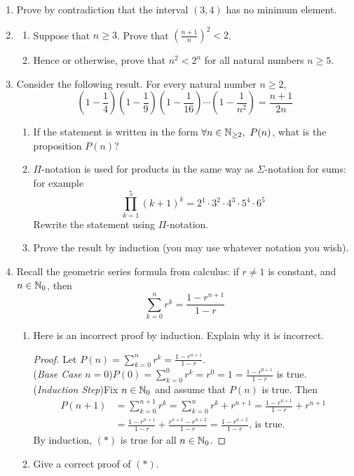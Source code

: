 \begin{exercises}{}{}

\begin{enumerate}
  \item Prove by contradiction that the interval $(3,4)$ has no minimum element.
  
  \item\begin{enumerate}
    \item Suppose that $n\ge 3$. Prove that $\left(\frac{n+1}n\right)^2<2$.
    \item Hence or otherwise, prove that $n^2<2^n$ for all natural numbers $n\ge 5$.
  \end{enumerate}

  \item Consider the following result. For every natural number $n\ge 2$,
	\[\left(1-\frac{1}{4}\right) \left(1-\frac{1}{9}\right) \left(1-\frac{1}{16}\right) \cdots \left(1-\frac{1}{n^2}\right) = \frac{n+1}{2n}\]
  \begin{enumerate}
    \item If the statement is written in the form $\forall n\in\mathbb{N}_{\ge 2},\ P(n)$, what is the proposition $P(n)$?
    \item $\Pi$-notation is used for products in the same way as $\Sigma$-notation for sums: for example
    \[\prod_{k=1}^5(k+1)^k=2^1\cdot 3^2\cdot 4^3\cdot 5^4\cdot 6^5\]
    Rewrite the statement using $\Pi$-notation.
    \item Prove the result by induction (you may use whatever notation you wish).
  \end{enumerate}
	
	\item Recall the geometric series formula from calculus: if $r\neq 1$ is constant, and $n\in\mathbb{N}_0$, then
	\[\sum_{k=0}^nr^k=\frac{1-r^{n+1}}{1-r}\tag*{$(\ast)$}\]
	\begin{enumerate}
	  \item Here is an incorrect proof by induction. Explain why it is incorrect.
	  \begin{proof}
	  Let $P(n)=\sum\limits_{k=0}^nr^k=\frac{1-r^{n+1}}{1-r}$.\\
	  (\emph{Base Case} $n=0$)\quad $P(0)=\sum\limits_{k=0}^0r^k=r^0=1=\frac{1-r^{0+1}}{1-r}$ is true.\\
	  (\emph{Induction Step})\quad Fix $n\in\mathbb{N}_0$ and assume that $P(n)$ is true. Then
	  \begin{align*}
	  P(n+1)&=\sum_{k=0}^{n+1}r^k=\sum_{k=0}^nr^k+r^{n+1}=\frac{1-r^{n+1}}{1-r}+r^{n+1}\\
	  &=\frac{1-r^{n+1}}{1-r}+\frac{r^{n+1}-r^{n+2}}{1-r}=\frac{1-r^{n+2}}{1-r}\text{, \ is true.}
	  \end{align*}
	  By induction, $(\ast)$ is true for all $n\in\mathbb{N}_0$.
	  \end{proof}
	  \item Give a correct proof of $(\ast)$.
	\end{enumerate}
	

\end{enumerate}
\end{exercises}
